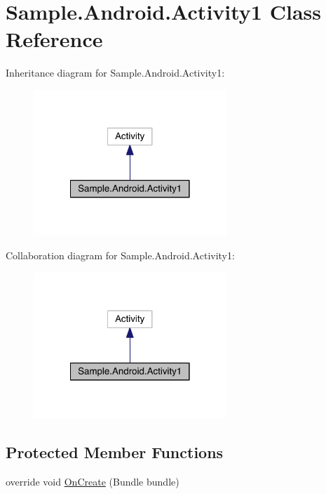\hypertarget{class_sample_1_1_android_1_1_activity1}{\section{Sample.\+Android.\+Activity1 Class Reference}
\label{class_sample_1_1_android_1_1_activity1}
}


Inheritance diagram for Sample.\+Android.\+Activity1\+:
\nopagebreak
\begin{figure}[H]
\begin{center}
\leavevmode
\includegraphics[width=206pt]{class_sample_1_1_android_1_1_activity1__inherit__graph}
\end{center}
\end{figure}


Collaboration diagram for Sample.\+Android.\+Activity1\+:
\nopagebreak
\begin{figure}[H]
\begin{center}
\leavevmode
\includegraphics[width=206pt]{class_sample_1_1_android_1_1_activity1__coll__graph}
\end{center}
\end{figure}
\subsection*{Protected Member Functions}
\begin{DoxyCompactItemize}
\item 
override void \hyperlink{class_sample_1_1_android_1_1_activity1_abfaeb0087202bef8556b00a80992d13e}{On\+Create} (Bundle bundle)
\end{DoxyCompactItemize}


